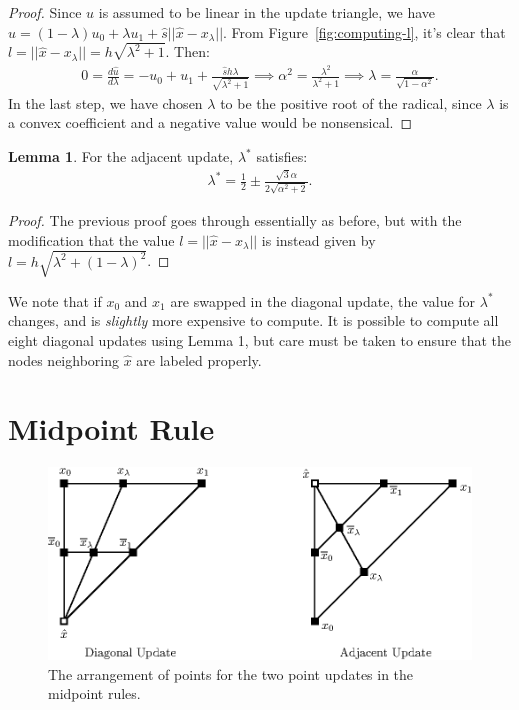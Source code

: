 \documentclass{article}
\theoremstyle{definition}
\newtheorem{lemma}{Lemma}
\begin{document}
\begin{proof}
  Since $u$ is assumed to be linear in the update triangle, we have
  $\hat{u} = (1 - \lambda) u_0 + \lambda u_1 + \hat{s} ||\hat{x} -
  x_\lambda||$. From Figure~\ref{fig:computing-l}, it's clear that
  $l = ||\hat{x} - x_\lambda|| = h \sqrt{\lambda^2 + 1}$. Then:
  \begin{align*}
    0 = \frac{d \hat{u}}{d \lambda} = -u_0 + u_1 + \frac{\hat{s} h \lambda}{\sqrt{\lambda^2 + 1}} \implies \alpha^2 = \frac{\lambda^2}{\lambda^2 + 1} \implies \lambda = \frac{\alpha}{\sqrt{1 - \alpha^2}}.
  \end{align*}
  In the last step, we have chosen $\lambda$ to be the positive root
  of the radical, since $\lambda$ is a convex coefficient and a
  negative value would be nonsensical.
\end{proof}

\begin{lemma}\label{lemma:rhr-adjacent-update}
  For the adjacent update, $\lambda^*$ satisfies:
  \begin{align*}
    \lambda^* = \frac{1}{2} \pm \frac{\sqrt{3} \alpha}{2 \sqrt{\alpha^2 + 2}}.
  \end{align*}
\end{lemma}

\begin{proof}
  The previous proof goes through essentially as before, but with the
  modification that the value $l = ||\hat{x} - x_\lambda||$ is instead
  given by $l = h \sqrt{\lambda^2 + (1 - \lambda)^2}$.
\end{proof}

We note that if $x_0$ and $x_1$ are swapped in the diagonal update,
the value for $\lambda^*$ changes, and is \emph{slightly} more
expensive to compute. It is possible to compute all eight diagonal
updates using Lemma 1, but care must be taken to ensure that the nodes
neighboring $\hat{x}$ are labeled properly.

\section{Midpoint Rule}

\begin{figure}[h]
  \centering
  \includegraphics{midpoint_update.eps}
  \caption{The arrangement of points for the two point updates in the
    midpoint rules.}\label{fig:midpoint-update}
\end{figure}
\end{document}
